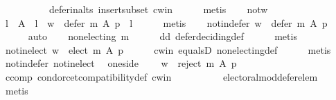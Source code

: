\begin{isabellebody}
\ \ \ \ \ \ \ \ \ \ defer{\isacharunderscore}{\kern0pt}in{\isacharunderscore}{\kern0pt}alts\ insert{\isacharunderscore}{\kern0pt}subset\ c{\isacharunderscore}{\kern0pt}win\isanewline
\ \ \ \ \isamarkupfalse%
\ metis\isanewline
\ \ \isamarkupfalse%
\ not{\isacharunderscore}{\kern0pt}w\ \isamarkupfalse%
\ {\isachardoublequoteopen}{\isasymexists}l\ {\isasymin}\ A\ {\isachardot}{\kern0pt}\ l\ {\isasymnoteq}\ w\ {\isasymand}\ defer\ m\ A\ p\ {\isacharequal}{\kern0pt}\ {\isacharbraceleft}{\kern0pt}l{\isacharbraceright}{\kern0pt}{\isachardoublequoteclose}\isanewline
\ \ \ \ \isamarkupfalse%
\ metis\isanewline
\ \ \isamarkupfalse%
\ not{\isacharunderscore}{\kern0pt}in{\isacharunderscore}{\kern0pt}defer{\isacharcolon}{\kern0pt}\ {\isachardoublequoteopen}w\ {\isasymnotin}\ defer\ m\ A\ p{\isachardoublequoteclose}\isanewline
\ \ \ \ \isamarkupfalse%
\ auto\isanewline
\ \ \isamarkupfalse%
\ {\isachardoublequoteopen}non{\isacharunderscore}{\kern0pt}electing\ m{\isachardoublequoteclose}\isanewline
\ \ \ \ \isamarkupfalse%
\ dd\ defer{\isacharunderscore}{\kern0pt}deciding{\isacharunderscore}{\kern0pt}def\isanewline
\ \ \ \ \isamarkupfalse%
\ metis\isanewline
\ \ \isamarkupfalse%
\ not{\isacharunderscore}{\kern0pt}in{\isacharunderscore}{\kern0pt}elect{\isacharcolon}{\kern0pt}\ {\isachardoublequoteopen}w\ {\isasymnotin}\ elect\ m\ A\ p{\isachardoublequoteclose}\isanewline
\ \ \ \ \isamarkupfalse%
\ c{\isacharunderscore}{\kern0pt}win\ equals{}D\ non{\isacharunderscore}{\kern0pt}electing{\isacharunderscore}{\kern0pt}def\isanewline
\ \ \ \ \isamarkupfalse%
\ metis\isanewline
\ \ \isamarkupfalse%
\ not{\isacharunderscore}{\kern0pt}in{\isacharunderscore}{\kern0pt}defer\ not{\isacharunderscore}{\kern0pt}in{\isacharunderscore}{\kern0pt}elect\ \isamarkupfalse%
\ one{\isacharunderscore}{\kern0pt}side{\isacharcolon}{\kern0pt}\isanewline
\ \ \ \ {\isachardoublequoteopen}w\ {\isasymin}\ reject\ m\ A\ p{\isachardoublequoteclose}\isanewline
\ \ \ \ \isamarkupfalse%
\ ccomp\ condorcet{\isacharunderscore}{\kern0pt}compatibility{\isacharunderscore}{\kern0pt}def\ c{\isacharunderscore}{\kern0pt}win\isanewline
\ \ \ \ \ \ \ \ \ \ electoral{\isacharunderscore}{\kern0pt}mod{\isacharunderscore}{\kern0pt}defer{\isacharunderscore}{\kern0pt}elem\isanewline
\ \ \ \ \isamarkupfalse%
\ metis\isanewline
\ \ \isamarkupfalse%

\end{isabellebody}
